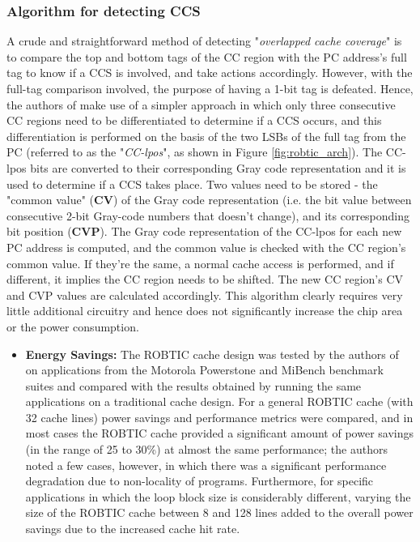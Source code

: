 \documentclass[conference]{IEEEtran}
\begin{document}
\subsubsection{Algorithm for detecting CCS}
A crude and straightforward method of detecting "\textit{overlapped cache coverage}" is to compare the top and bottom tags of the CC region with the PC address's full tag to know if a CCS is involved, and take actions accordingly. However, with the full-tag comparison involved, the purpose of having a 1-bit tag is defeated.
Hence, the authors of \cite{robtic} make use of a simpler approach in which only three consecutive CC regions need to be differentiated to determine if a CCS occurs, and this differentiation is performed on the basis of the two LSBs of the full tag from the PC (referred to as the "\textit{CC-lpos}", as shown in Figure \ref{fig:robtic_arch}). The CC-lpos bits are converted to their corresponding Gray code representation and it is used to determine if a CCS takes place. Two values need to be stored - the "common value" (\textbf{CV}) of the Gray code representation (i.e. the bit value between consecutive 2-bit Gray-code numbers that doesn't change), and its corresponding bit position (\textbf{CVP}). The Gray code representation of the CC-lpos for each new PC address is computed, and the common value is checked with the CC region's common value. If they're the same, a normal cache access is performed, and if different, it implies the CC region needs to be shifted. The new CC region's CV and CVP values are calculated accordingly.
This algorithm clearly requires very little additional circuitry and hence does not significantly increase the chip area or the power consumption.

\begin{itemize}
\item \textbf{Energy Savings:} The ROBTIC cache design was tested by the authors of \cite{robtic} on applications from the Motorola Powerstone and MiBench benchmark suites and compared with the results obtained by running the same applications on a traditional cache design. For a general ROBTIC cache (with 32 cache lines) power savings and performance metrics were compared, and in most cases the ROBTIC cache provided a significant amount of power savings (in the range of 25 to 30\%) at almost the same performance; the authors noted a few cases, however, in which there was a significant performance degradation due to non-locality of programs. Furthermore, for specific applications in which the loop block size is considerably different, varying the size of the ROBTIC cache between 8 and 128 lines added to the overall power savings due to the increased cache hit rate.
\end{itemize}
\end{document}
